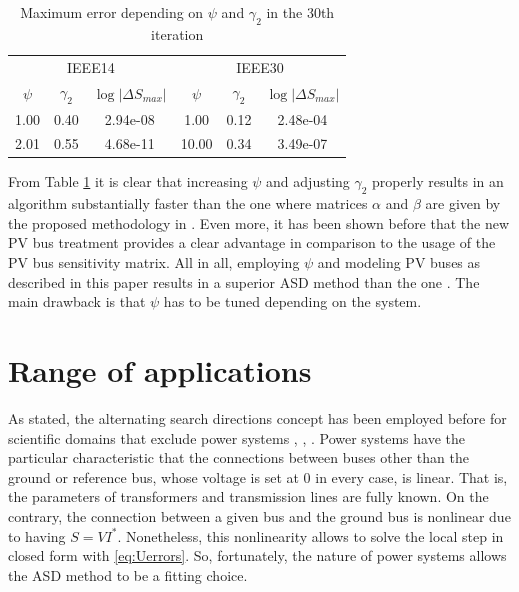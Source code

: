 \documentclass[journal]{IEEEtran}
\begin{document}
\begin{table}[!ht]
  \renewcommand{\arraystretch}{1.3}
  \caption{Maximum error depending on $\psi$ and $\gamma_2$ in the 30th iteration}
  \label{tab:1}
  \centering
  \begin{tabular}{ccc|ccc}
  \hline 
  \multicolumn{3}{c}{IEEE14} & \multicolumn{3}{|c}{IEEE30}\\
  $\psi$ & $\gamma_2$ & $\log|\Delta S_{max}|$ & $\psi$ & $\gamma_2$ & $\log|\Delta S_{max}|$\\
  \cline{1-3}  \cline{4-6}
  1.00 & 0.40 & 2.94e-08 & 1.00 & 0.12 & 2.48e-04\\
  2.01 & 0.55 & 4.68e-11 & 10.00 & 0.34 & 3.49e-07\\
  \hline
  \end{tabular}
  \end{table} 

From Table \ref{tab:1} it is clear that increasing $\psi$ and adjusting $\gamma_2$ properly results in an algorithm substantially faster than the one where matrices $\alpha$ and $\beta$ are given by the proposed methodology in \cite{asd}. Even more, it has been shown before that the new PV bus treatment provides a clear advantage in comparison to the usage of the PV bus sensitivity matrix. All in all, employing $\psi$ and modeling PV buses as described in this paper results in a superior ASD method than the one \cite{asd}. The main drawback is that $\psi$ has to be tuned depending on the system.

\section{Range of applications}\label{sec3}
As stated, the alternating search directions concept has been employed before for scientific domains that exclude power systems \cite{Rimek}, \cite{samarskii}, \cite{ladeveze}. Power systems have the particular characteristic that the connections between buses other than the ground or reference bus, whose voltage is set at 0 in every case, is linear. That is, the parameters of transformers and transmission lines are fully known. On the contrary, the connection between a given bus and the ground bus is nonlinear due to having $S=VI^*$. Nonetheless, this nonlinearity allows to solve the local step in closed form with \eqref{eq:Uerrors}. So, fortunately, the nature of power systems allows the ASD method to be a fitting choice. 
\end{document}
